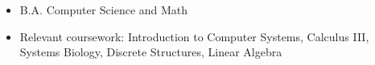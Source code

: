 \documentclass[a4paper]{resume}
\begin{document}
\vspace*{-20pt}



\vspace{10pt}

\begin{itemize} \vspace{-5pt} \itemsep -2pt
	\item B.A. Computer Science and Math
	\item Relevant coursework: Introduction to Computer Systems, Calculus III, Systems Biology, Discrete Structures, Linear Algebra
\end{itemize}
\enresection
\end{document}
